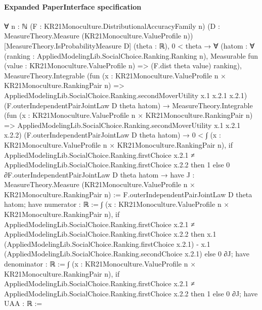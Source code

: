 \documentclass[10pt]{article}
\begin{document}
\paragraph{Expanded PaperInterface specification}
\begin{ReviewVerbatim}
∀ {n : ℕ} (F : KR21Monoculture.DistributionalAccuracyFamily n)
  (D : MeasureTheory.Measure (KR21Monoculture.ValueProfile n)) [MeasureTheory.IsProbabilityMeasure D] (theta : ℝ),
  0 < theta →
    ∀
      (hatom :
        ∀ (ranking : AppliedModelingLib.SocialChoice.Ranking.Ranking n),
          Measurable fun (value : KR21Monoculture.ValueProfile n) => (F.dist theta value) ranking),
      MeasureTheory.Integrable
          (fun (x : KR21Monoculture.ValueProfile n × KR21Monoculture.RankingPair n) =>
            AppliedModelingLib.SocialChoice.Ranking.secondMoverUtility x.1 x.2.1 x.2.1)
          (F.outerIndependentPairJointLaw D theta hatom) →
        MeasureTheory.Integrable
            (fun (x : KR21Monoculture.ValueProfile n × KR21Monoculture.RankingPair n) =>
              AppliedModelingLib.SocialChoice.Ranking.secondMoverUtility x.1 x.2.1 x.2.2)
            (F.outerIndependentPairJointLaw D theta hatom) →
          0 <
              ∫ (x : KR21Monoculture.ValueProfile n × KR21Monoculture.RankingPair n),
                if
                    AppliedModelingLib.SocialChoice.Ranking.firstChoice x.2.1 ≠
                      AppliedModelingLib.SocialChoice.Ranking.firstChoice x.2.2 then
                  1
                else 0 ∂F.outerIndependentPairJointLaw D theta hatom →
            have J : MeasureTheory.Measure (KR21Monoculture.ValueProfile n × KR21Monoculture.RankingPair n) :=
              F.outerIndependentPairJointLaw D theta hatom;
            have numerator : ℝ :=
              ∫ (x : KR21Monoculture.ValueProfile n × KR21Monoculture.RankingPair n),
                if
                    AppliedModelingLib.SocialChoice.Ranking.firstChoice x.2.1 ≠
                      AppliedModelingLib.SocialChoice.Ranking.firstChoice x.2.2 then
                  x.1 (AppliedModelingLib.SocialChoice.Ranking.firstChoice x.2.1) -
                    x.1 (AppliedModelingLib.SocialChoice.Ranking.secondChoice x.2.1)
                else 0 ∂J;
            have denominator : ℝ :=
              ∫ (x : KR21Monoculture.ValueProfile n × KR21Monoculture.RankingPair n),
                if
                    AppliedModelingLib.SocialChoice.Ranking.firstChoice x.2.1 ≠
                      AppliedModelingLib.SocialChoice.Ranking.firstChoice x.2.2 then
                  1
                else 0 ∂J;
            have UAA : ℝ :=

\end{ReviewVerbatim}
\end{document}

